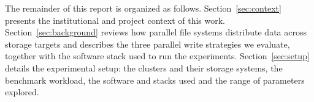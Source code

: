 The remainder of this report is organized as follows. Section~\ref{sec:context} presents the institutional and project context of this work. 
Section~\ref{sec:background} reviews how parallel file systems distribute data across storage targets and describes the three parallel write strategies 
we evaluate, together with the software stack used to run the experiments. Section~\ref{sec:setup} details the experimental setup: the clusters and their 
storage systems, the benchmark workload, the software and stacks used and the range of parameters explored. 